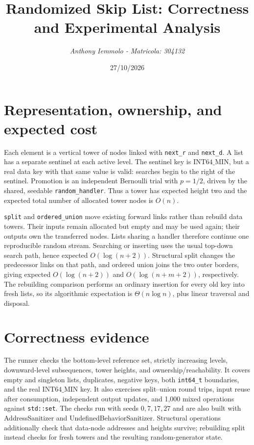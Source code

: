 \documentclass[10pt,a4paper]{article}
\newcommand{\code}[1]{\texttt{#1}}
\begin{document}
\title{Randomized Skip List: Correctness and Experimental Analysis}
\author{\textit{Anthony Iemmolo - Matricola: 304132}}
\date{27/10/2026}
\maketitle
\vspace{-2.2em}

\section*{Representation, ownership, and expected cost}
Each element is a vertical tower of nodes linked with \code{next\_r} and
\code{next\_d}.  A list has a separate sentinel at each active level.  The
sentinel key is \(\mathrm{INT64\_MIN}\), but a real data key with that same
value is valid: searches begin to the right of the sentinel.  Promotion is an
independent Bernoulli trial with \(p=1/2\), driven by the shared,
seedable \code{random\_handler}.  Thus a tower has expected height two and
the expected total number of allocated tower nodes is \(O(n)\).

\code{split} and \code{ordered\_union} move existing forward links rather
than rebuild data towers.  Their inputs remain allocated but empty and may be
used again; their outputs own the transferred nodes.  Lists sharing a handler
therefore continue one reproducible random stream.  Searching or inserting
uses the usual top-down search path, hence expected \(O(\log(n+2))\).
Structural split changes the predecessor links on that path, and ordered union
joins the two outer borders, giving expected \(O(\log(n+2))\) and
\(O(\log(n+m+2))\), respectively.  The rebuilding comparison performs an
ordinary insertion for every old key into fresh lists, so its algorithmic
expectation is \(\Theta(n\log n)\), plus linear traversal and disposal.

\section*{Correctness evidence}
The runner checks the bottom-level reference set, strictly increasing levels,
downward-level subsequences, tower heights, and ownership/reachability.  It
covers empty and singleton lists, duplicates, negative keys, both \code{int64\_t}
boundaries, and the real \(\mathrm{INT64\_MIN}\) key.  It also exercises
split--union round trips, input reuse after consumption, independent output
updates, and 1,000 mixed operations against \code{std::set}.  The checks run
with seeds \(0,7,17,27\) and are also built with AddressSanitizer and
UndefinedBehaviorSanitizer.  Structural operations additionally check that
data-node addresses and heights survive; rebuilding split instead checks for
fresh towers and the resulting random-generator state.
\end{document}
